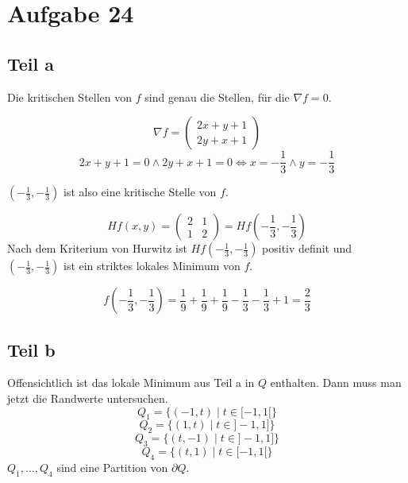 \documentclass[10pt,a4paper]{article}
\begin{document}
\section*{Aufgabe 24}

\subsection*{Teil a}

Die kritischen Stellen von $f$ sind genau die Stellen, für die $\nabla f = 0$.

\begin{equation}
\nabla f = \begin{pmatrix}
2x + y + 1\\
2y + x + 1
\end{pmatrix}
\end{equation}
\begin{equation}
2x + y + 1 = 0 \land 2y + x + 1 = 0 \Leftrightarrow x = -\frac{1}{3} \land y = -\frac{1}{3}
\end{equation}

$(-\frac{1}{3}, -\frac{1}{3})$ ist also eine kritische Stelle von $f$.

\begin{equation}
Hf(x, y) = \begin{pmatrix}
2 & 1\\
1 & 2
\end{pmatrix} = Hf(-\frac{1}{3}, -\frac{1}{3})
\end{equation}
Nach dem Kriterium von Hurwitz ist $Hf(-\frac{1}{3}, -\frac{1}{3})$ positiv definit und $(-\frac{1}{3}, -\frac{1}{3})$ ist ein striktes lokales Minimum von $f$.

\begin{equation}
f(-\frac{1}{3}, -\frac{1}{3}) = \frac{1}{9} + \frac{1}{9} + \frac{1}{9} - \frac{1}{3} - \frac{1}{3} + 1 = \frac{2}{3}
\end{equation}

\subsection*{Teil b}

Offensichtlich ist das lokale Minimum aus Teil a in $Q$ enthalten.
Dann muss man jetzt die Randwerte untersuchen.
\begin{equation}
Q_{1} = \{ (-1, t) \mid t \in [-1, 1[ \}
\end{equation}
\begin{equation}
Q_{2} = \{ (1, t) \mid t \in ]-1, 1] \}
\end{equation}
\begin{equation}
Q_{3} = \{ (t, -1) \mid t \in ]-1, 1] \}
\end{equation}
\begin{equation}
Q_{4} = \{ (t, 1) \mid t \in [-1, 1[ \}
\end{equation}
$Q_{1}, \dots, Q_{4}$ sind eine Partition von $\partial Q$.
\end{document}
